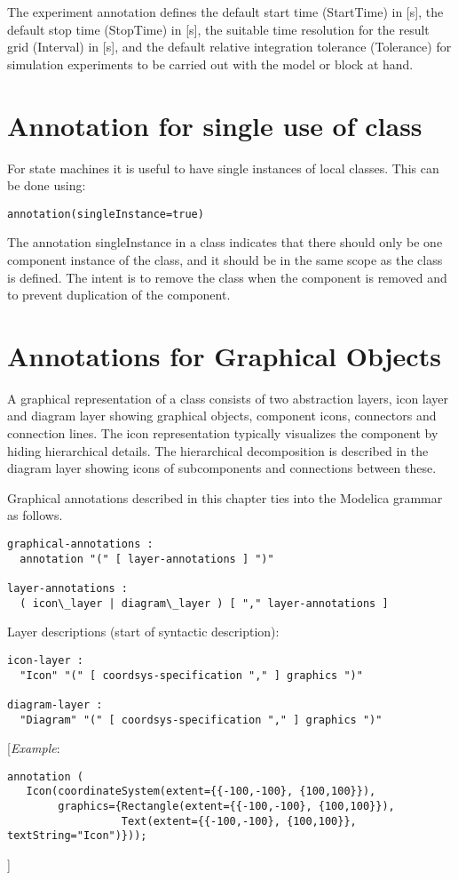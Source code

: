 The experiment annotation defines the default start time (StartTime) in
  {[}s{]}, the default stop time (StopTime) in {[}s{]}, the suitable time
  resolution for the result grid (Interval) in {[}s{]}, and the default
relative integration tolerance (Tolerance) for simulation experiments to
be carried out with the model or block at hand.

\section{Annotation for single use of class}

For state machines it is useful to have single instances of local
classes. This can be done using:
\begin{lstlisting}[language=modelica]
annotation(singleInstance=true)
\end{lstlisting}

The annotation singleInstance in a class indicates that there should
only be one component instance of the class, and it should be in the
same scope as the class is defined. The intent is to remove the class
when the component is removed and to prevent duplication of the
component.

\section{Annotations for Graphical Objects}

A graphical representation of a class consists of two abstraction
layers, icon layer and diagram layer showing graphical objects,
component icons, connectors and connection lines. The icon
representation typically visualizes the component by hiding hierarchical
details. The hierarchical decomposition is described in the diagram
layer showing icons of subcomponents and connections between these.

Graphical annotations described in this chapter ties into the Modelica
grammar as follows.
\begin{lstlisting}[language=grammar]
graphical-annotations :
  annotation "(" [ layer-annotations ] ")"

layer-annotations :
  ( icon\_layer | diagram\_layer ) [ "," layer-annotations ]
\end{lstlisting}
Layer descriptions (start of syntactic description):
\begin{lstlisting}[language=grammar]
icon-layer :
  "Icon" "(" [ coordsys-specification "," ] graphics ")"

diagram-layer :
  "Diagram" "(" [ coordsys-specification "," ] graphics ")"
\end{lstlisting}
{[}\emph{Example}:
\begin{lstlisting}[language=modelica]
annotation (
   Icon(coordinateSystem(extent={{-100,-100}, {100,100}}),
        graphics={Rectangle(extent={{-100,-100}, {100,100}}),
                  Text(extent={{-100,-100}, {100,100}}, textString="Icon")}));
\end{lstlisting}
{]}

